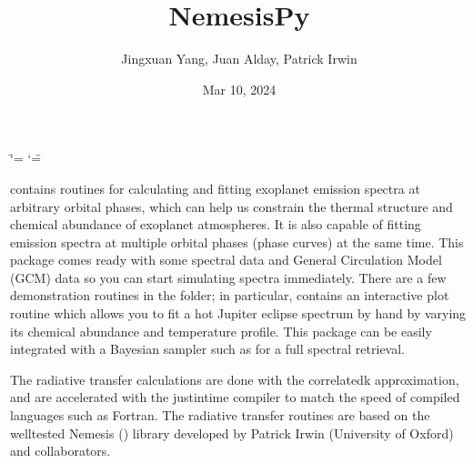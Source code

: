 \documentclass[letterpaper,10pt,english]{sphinxmanual}
\title{NemesisPy}
\date{Mar 10, 2024}
\author{Jingxuan Yang, Juan Alday, Patrick Irwin}
\begin{document}
\ifdefined\shorthandoff
  \ifnum\catcode`\=\string=\active\shorthandoff{=}\fi
  \ifnum\catcode`\"=\active{}\fi
\fi

\pagestyle{empty}
\sphinxmaketitle
\pagestyle{plain}
\sphinxtableofcontents
\pagestyle{normal}
\label{\detokenize{index::doc}}


\sphinxAtStartPar
{} contains routines for calculating and fitting
exoplanet emission spectra at arbitrary orbital phases,
which can help us constrain the thermal structure and chemical
abundance of exoplanet atmospheres. It is also capable
of fitting emission spectra at multiple orbital phases
(phase curves) at the same time. This package
comes ready with some spectral data and General Circulation
Model (GCM) data so you can start simulating spectra immediately.
There are a few demonstration routines in
the  folder; in particular, 
contains an interactive plot routine which allows you
to fit a hot Jupiter eclipse spectrum by hand by varying
its chemical abundance and temperature profile. This package
can be easily integrated with a Bayesian sampler such as
 for a full spectral retrieval.

\sphinxAtStartPar
The radiative transfer calculations are done with the
correlated\sphinxhyphen{}k approximation, and are accelerated with the
 just\sphinxhyphen{}in\sphinxhyphen{}time compiler to match the speed of
compiled languages such as Fortran. The radiative transfer
routines are based on the well\sphinxhyphen{}tested Nemesis ()
library developed by Patrick Irwin (University of Oxford) and collaborators.
\end{document}
